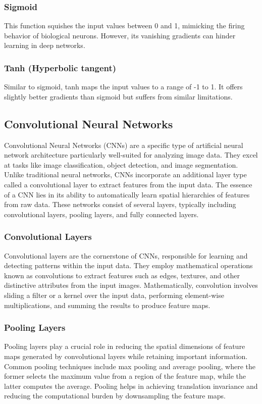 \documentclass{article}
\begin{document}
\subsubsection{Sigmoid}
This function squishes the input values between 0 and 1, mimicking the firing behavior of biological neurons. However, its vanishing gradients can hinder learning in deep networks.

\subsubsection{Tanh (Hyperbolic tangent)}
Similar to sigmoid, tanh maps the input values to a range of -1 to 1. It offers slightly better gradients than sigmoid but suffers from similar limitations.

\subsection{Convolutional Neural Networks}
Convolutional Neural Networks (CNNs) are a specific type of artificial neural network architecture particularly well-suited for analyzing image data. They excel at tasks like image classification, object detection, and image segmentation. Unlike traditional neural networks, CNNs incorporate an additional layer type called a convolutional layer to extract features from the input data. The essence of a CNN lies in its ability to automatically learn spatial hierarchies of features from raw data. These networks consist of several layers, typically including convolutional layers, pooling layers, and fully connected layers.

\subsubsection{Convolutional Layers}
Convolutional layers are the cornerstone of CNNs, responsible for learning and detecting patterns within the input data. They employ mathematical operations known as convolutions to extract features such as edges, textures, and other distinctive attributes from the input images. Mathematically, convolution involves sliding a filter or a kernel over the input data, performing element-wise multiplications, and summing the results to produce feature maps.

\subsubsection{Pooling Layers}
Pooling layers play a crucial role in reducing the spatial dimensions of feature maps generated by convolutional layers while retaining important information. Common pooling techniques include max pooling and average pooling, where the former selects the maximum value from a region of the feature map, while the latter computes the average. Pooling helps in achieving translation invariance and reducing the computational burden by downsampling the feature maps.
\end{document}
